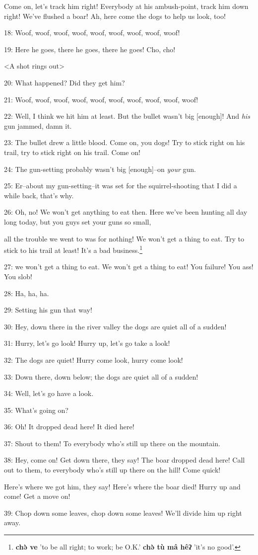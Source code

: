 Come on, let's track him right! Everybody at his ambush-point, track him down right!
We've flushed a boar! Ah, here come the dogs to help us look, too!

18: Woof, woof, woof, woof, woof, woof, woof, woof, woof!

19: Here he goes, there he goes, there he goes! Cho, cho!

<A shot rings out>

20: What happened? Did they get him?

21: Woof, woof, woof, woof, woof, woof, woof, woof, woof, woof!

22: Well, I think we hit him at least. But the bullet wasn't big [enough]! And
\textit{his} gun jammed, damn it.

23: The bullet drew a little blood. Come on, you dogs! Try to stick right on his
trail, try to stick right on his trail. Come on!

24: The gun-setting probably wasn't big [enough]--on \textit{your} gun.

25: Er--about my gun-setting--it was set for the squirrel-shooting that I did a
while back, that's why.

26: Oh, no! We won't get anything to eat then. Here we've been hunting all day
long today, but you guys set your guns so small,

all the trouble we went to was for nothing! We won't get a thing to eat. Try to
stick to his trail at least!  It's a bad business.\footnote{\textbf{chə̀ ve} 'to be all right; to work; be O.K.' \textbf{chə̀ tù mâ hêʔ} 'it's no good'.}

27: we won't get a thing to eat. We won't get a thing to eat! You failure! You
ass! You slob!

28: Ha, ha, ha.

29: Setting his gun that way!

30: Hey, down there in the river valley the dogs are quiet all of a sudden!

31: Hurry, let's go look! Hurry up, let's go take a look!

32: The dogs are quiet! Hurry come look, hurry come look!

33: Down there, down below; the dogs are quiet all of a sudden!

34: Well, let's go have a look.

35: What's going on?

36: Oh! It dropped dead here! It died here!

37: Shout to them! To everybody who's still up there on the mountain.

38: Hey, come on! Get down there, they say! The boar dropped dead here! Call out
to them, to everybody who's still up there on the hill! Come quick!

Here's where we got him, they say! Here's where the boar died! Hurry up and come!
Get a move on!

39: Chop down some leaves, chop down some leaves! We'll divide him up right away.
